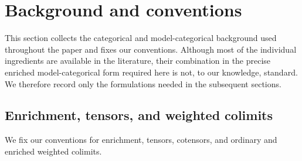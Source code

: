\documentclass{amsart}
\theoremstyle{definition}
\numberwithin{equation}{subsection}
\numberwithin{subsubsection}{subsection}
\begin{document}
\section{Background and conventions}\label{sec:background}

This section collects the categorical and model-categorical background used
throughout the paper and fixes our conventions. Although most of the individual
ingredients are available in the literature, their combination in the precise
enriched model-categorical form required here is not, to our knowledge,
standard. We therefore record only the formulations needed in the subsequent
sections.

\subsection{Enrichment, tensors, and weighted colimits}\label{subsec:enrichment}
We fix our conventions for enrichment, tensors, cotensors, and ordinary and
enriched weighted colimits.
\end{document}
